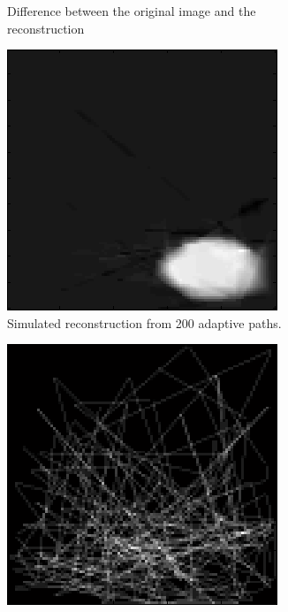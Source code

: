\documentclass[english]{article}\usepackage[]{graphicx}\usepackage[]{color}
\begin{document}
\begin{figure}
\begin{subfigure}{.22\textwidth}
  \caption{Difference between the original image and the reconstruction}
  \vspace{0pt}
  \label{fig:adp_randpaths_diff}
\end{subfigure}%
\caption{Simulated reconstruction using random paths as before.}
\label{fig:adp_randpaths_fig}
\begin{subfigure}{.22\textwidth}
  \centering
    \includegraphics[width=1\linewidth]{figures/adaptiveresultrec}
  \caption{Simulated reconstruction from 200 adaptive paths.}
  \vspace{0pt}
  \label{fig:adp_adpaths_sim_rec}
\end{subfigure}%
\hspace{10pt}
\begin{subfigure}{.22\textwidth}
  \centering
    \includegraphics[width=1\linewidth]{figures/adaptiveresultpath}

\end{subfigure}
\end{figure}
\end{document}
